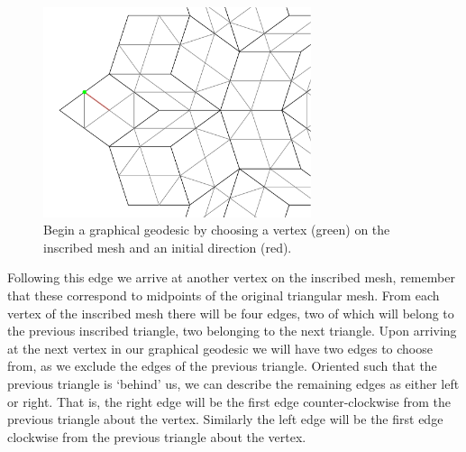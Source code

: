 \documentclass[
  oneside,
  11pt, a4paper,
  footinclude=true,
  headinclude=true,
  cleardoublepage=empty
]{scrbook}
\begin{document}
\begin{figure}[H]
\centering
\includegraphics[width=0.7\textwidth]{FirstStep}
\caption[First Step of Geodesic]{Begin a graphical geodesic by choosing a vertex (green) on the inscribed mesh and an initial direction (red).}
\label{fig:startstep}
\end{figure}
Following this edge we arrive at another vertex on the inscribed mesh, remember that these correspond to midpoints of the original triangular mesh. From each vertex of the inscribed mesh there will be four edges, two of which will belong to the previous inscribed triangle, two belonging to the next triangle. Upon arriving at the next vertex in our graphical geodesic we will have two edges to choose from, as we exclude the edges of the previous triangle. Oriented such that the previous triangle is `behind' us, we can describe the remaining edges as either left or right. That is, the right edge will be the first edge counter-clockwise from the previous triangle about the vertex. Similarly the left edge will be the first edge clockwise from the previous triangle about the vertex.
\end{document}
